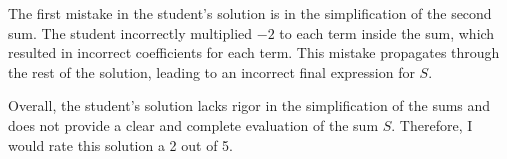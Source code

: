 The first mistake in the student's solution is in the simplification of the second sum. The student incorrectly multiplied $-2$ to each term inside the sum, which resulted in incorrect coefficients for each term. This mistake propagates through the rest of the solution, leading to an incorrect final expression for $S$. 

Overall, the student's solution lacks rigor in the simplification of the sums and does not provide a clear and complete evaluation of the sum $S$. Therefore, I would rate this solution a 2 out of 5.
